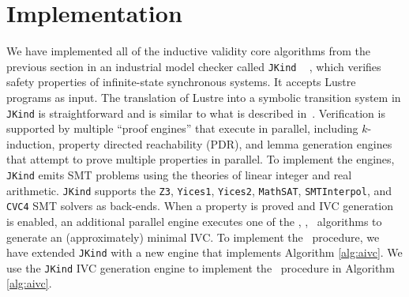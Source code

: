 \section{Implementation}
\label{sec:impl}

We have implemented all of the inductive validity core algorithms from the previous section in an industrial model checker called \texttt{JKind} ~\cite{jkind} ,
which verifies safety properties of infinite-state synchronous systems.
It accepts Lustre programs \cite{Halbwachs91:lustre} as input.  The translation of Lustre
into a symbolic transition system in \texttt{JKind} is straightforward and is similar to what is described
in~\cite{Hagen08:FMCAD}.
Verification is supported by multiple ``proof engines'' that execute in parallel, including $k$-induction,
property directed reachability (PDR), and lemma generation engines that attempt to prove
multiple properties in parallel.  To implement the engines,
\texttt{JKind} emits SMT problems using the theories of linear integer and real arithmetic.  \texttt{JKind} supports the
\texttt{Z3}, \texttt{Yices1}, \texttt{Yices2}, \texttt{MathSAT}, \texttt{SMTInterpol}, and \texttt{CVC4} SMT solvers as back-ends.  When a property is
proved and IVC generation is enabled, an additional parallel engine
executes one of the {\ucalg, \bfalg, \ucbfalg}~algorithms \cite{Ghass16} to generate an (approximately) minimal IVC.
%
To implement the \aivcalg\ procedure, we have extended \texttt{JKind} with a new engine that implements Algorithm \ref{alg:aivc}.
We use the \texttt{JKind} IVC generation engine to implement the \getivc\ procedure in  Algorithm \ref{alg:aivc}.


